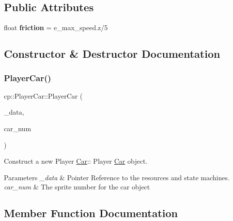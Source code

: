 \subsection*{Public Attributes}
\begin{DoxyCompactItemize}
\item 
\mbox{\label{classcp_1_1_player_car_ad139d2ca2964c27ffe84baa0e2fe4d86}} 
float {\bfseries friction} = e\+\_\+max\+\_\+speed.\+z/5
\end{DoxyCompactItemize}


\subsection{Constructor \& Destructor Documentation}
\mbox{\label{classcp_1_1_player_car_ae45b93194883e336252dc2c0563f228c}} 
\subsubsection{\texorpdfstring{Player\+Car()}{PlayerCar()}}
{\footnotesize\ttfamily cp\+::\+Player\+Car\+::\+Player\+Car (\begin{DoxyParamCaption}\item[{Game\+Data\+Ref}]{\+\_\+data,  }\item[{int}]{car\+\_\+num }\end{DoxyParamCaption})}



Construct a new Player \hyperlink{classcp_1_1_car}{Car}\+:\+: Player \hyperlink{classcp_1_1_car}{Car} object. 


\begin{DoxyParams}{Parameters}
{\em \+\_\+data} & Pointer Reference to the resources and state machines. \\
\hline
{\em car\+\_\+num} & The sprite number for the car object \\
\hline
\end{DoxyParams}


\subsection{Member Function Documentation}
\mbox{\label{classcp_1_1_player_car_a753b76abce4b6555916ca26919e614f0}} 
